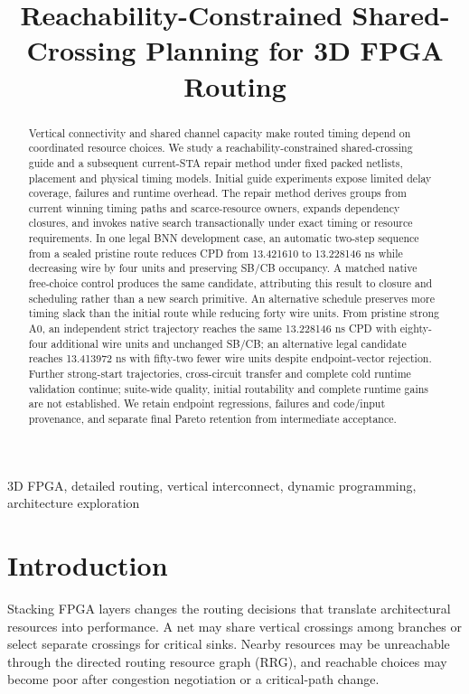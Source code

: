 \documentclass[conference,10pt]{IEEEtran}
\title{Reachability-Constrained Shared-Crossing Planning for 3D FPGA Routing}
\author{\IEEEauthorblockN{Anonymous submission draft}}
\begin{document}
\maketitle
\begin{abstract}
Vertical connectivity and shared channel capacity make routed timing depend on coordinated resource choices. We study a reachability-constrained shared-crossing guide and a subsequent current-STA repair method under fixed packed netlists, placement and physical timing models. Initial guide experiments expose limited delay coverage, failures and runtime overhead. The repair method derives groups from current winning timing paths and scarce-resource owners, expands dependency closures, and invokes native search transactionally under exact timing or resource requirements. In one legal BNN development case, an automatic two-step sequence from a sealed pristine route reduces CPD from 13.421610 to 13.228146 ns while decreasing wire by four units and preserving SB/CB occupancy. A matched native free-choice control produces the same candidate, attributing this result to closure and scheduling rather than a new search primitive. An alternative schedule preserves more timing slack than the initial route while reducing forty wire units. From pristine strong A0, an independent strict trajectory reaches the same 13.228146 ns CPD with eighty-four additional wire units and unchanged SB/CB; an alternative legal candidate reaches 13.413972 ns with fifty-two fewer wire units despite endpoint-vector rejection. Further strong-start trajectories, cross-circuit transfer and complete cold runtime validation continue; suite-wide quality, initial routability and complete runtime gains are not established. We retain endpoint regressions, failures and code/input provenance, and separate final Pareto retention from intermediate acceptance.
\end{abstract}
\begin{IEEEkeywords}
3D FPGA, detailed routing, vertical interconnect, dynamic programming, architecture exploration
\end{IEEEkeywords}

\section{Introduction}
Stacking FPGA layers changes the routing decisions that translate architectural resources into performance. A net may share vertical crossings among branches or select separate crossings for critical sinks. Nearby resources may be unreachable through the directed routing resource graph (RRG), and reachable choices may become poor after congestion negotiation or a critical-path change.
\end{document}
